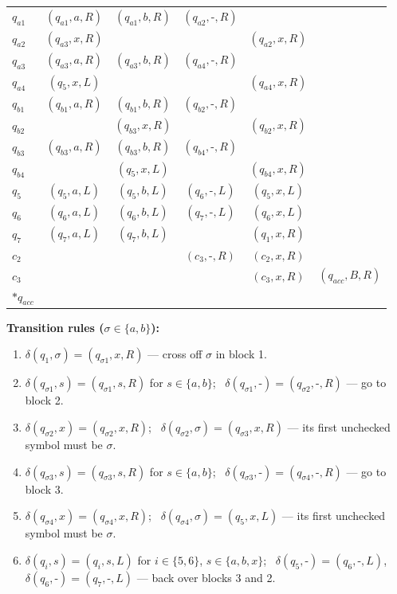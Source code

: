 \documentclass[11pt,a4paper]{article}
\begin{document}
\begin{solution}
\begin{center}
\begin{tabular}{l|ccccc}
$q_{a1}$ & $(q_{a1},a,R)$ & $(q_{a1},b,R)$ & $(q_{a2},\text{-},R)$ &  & \\
$q_{a2}$ & $(q_{a3},x,R)$ &  &  & $(q_{a2},x,R)$ & \\
$q_{a3}$ & $(q_{a3},a,R)$ & $(q_{a3},b,R)$ & $(q_{a4},\text{-},R)$ &  & \\
$q_{a4}$ & $(q_5,x,L)$ &  &  & $(q_{a4},x,R)$ & \\
$q_{b1}$ & $(q_{b1},a,R)$ & $(q_{b1},b,R)$ & $(q_{b2},\text{-},R)$ &  & \\
$q_{b2}$ &  & $(q_{b3},x,R)$ &  & $(q_{b2},x,R)$ & \\
$q_{b3}$ & $(q_{b3},a,R)$ & $(q_{b3},b,R)$ & $(q_{b4},\text{-},R)$ &  & \\
$q_{b4}$ &  & $(q_5,x,L)$ &  & $(q_{b4},x,R)$ & \\
$q_5$ & $(q_5,a,L)$ & $(q_5,b,L)$ & $(q_6,\text{-},L)$ & $(q_5,x,L)$ & \\
$q_6$ & $(q_6,a,L)$ & $(q_6,b,L)$ & $(q_7,\text{-},L)$ & $(q_6,x,L)$ & \\
$q_7$ & $(q_7,a,L)$ & $(q_7,b,L)$ &  & $(q_1,x,R)$ & \\
$c_2$ &  &  & $(c_3,\text{-},R)$ & $(c_2,x,R)$ & \\
$c_3$ &  &  &  & $(c_3,x,R)$ & $(q_{acc},B,R)$\\
$*q_{acc}$ &  &  &  &  & \\\bottomrule\end{tabular}\end{center}
\par\noindent\textbf{Transition rules ($\sigma\in\{a,b\}$):}
{\small\begin{enumerate}[label=\arabic*.,itemsep=0pt]
\item $\delta(q_1,\sigma)=(q_{\sigma1},x,R)$ --- cross off $\sigma$ in block 1.
\item $\delta(q_{\sigma1},s)=(q_{\sigma1},s,R)$ for $s\in\{a,b\}$; \ $\delta(q_{\sigma1},\text{-})=(q_{\sigma2},\text{-},R)$ --- go to block 2.
\item $\delta(q_{\sigma2},x)=(q_{\sigma2},x,R)$; \ $\delta(q_{\sigma2},\sigma)=(q_{\sigma3},x,R)$ --- its first unchecked symbol must be $\sigma$.
\item $\delta(q_{\sigma3},s)=(q_{\sigma3},s,R)$ for $s\in\{a,b\}$; \ $\delta(q_{\sigma3},\text{-})=(q_{\sigma4},\text{-},R)$ --- go to block 3.
\item $\delta(q_{\sigma4},x)=(q_{\sigma4},x,R)$; \ $\delta(q_{\sigma4},\sigma)=(q_5,x,L)$ --- its first unchecked symbol must be $\sigma$.
\item $\delta(q_i,s)=(q_i,s,L)$ for $i\in\{5,6\}$, $s\in\{a,b,x\}$; \ $\delta(q_5,\text{-})=(q_6,\text{-},L)$, \ $\delta(q_6,\text{-})=(q_7,\text{-},L)$ --- back over blocks 3 and 2.

\end{enumerate}}
\end{solution}
\end{document}
